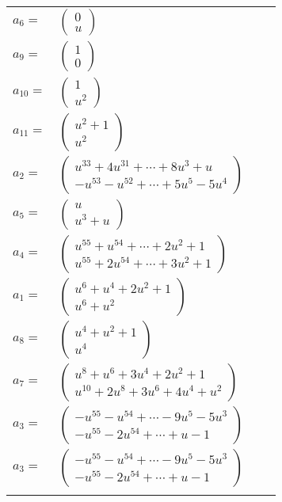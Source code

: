 \documentclass[1p]{elsarticle_modified}
\theoremstyle{definition}
\begin{document}
\begin{tabular}{m{7pt} m{180pt} m{7pt} m{180pt} }
\flushright $a_{6}=$&$\begin{pmatrix}0\\u\end{pmatrix}$ \\
\flushright $a_{9}=$&$\begin{pmatrix}1\\0\end{pmatrix}$ \\
\flushright $a_{10}=$&$\begin{pmatrix}1\\u^2\end{pmatrix}$ \\
\flushright $a_{11}=$&$\begin{pmatrix}u^2+1\\u^2\end{pmatrix}$ \\
\flushright $a_{2}=$&$\begin{pmatrix}u^{33}+4 u^{31}+\cdots+8 u^3+u\\- u^{53}- u^{52}+\cdots+5 u^5-5 u^4\end{pmatrix}$ \\
\flushright $a_{5}=$&$\begin{pmatrix}u\\u^3+u\end{pmatrix}$ \\
\flushright $a_{4}=$&$\begin{pmatrix}u^{55}+u^{54}+\cdots+2 u^2+1\\u^{55}+2 u^{54}+\cdots+3 u^2+1\end{pmatrix}$ \\
\flushright $a_{1}=$&$\begin{pmatrix}u^6+u^4+2 u^2+1\\u^6+u^2\end{pmatrix}$ \\
\flushright $a_{8}=$&$\begin{pmatrix}u^4+u^2+1\\u^4\end{pmatrix}$ \\
\flushright $a_{7}=$&$\begin{pmatrix}u^8+u^6+3 u^4+2 u^2+1\\u^{10}+2 u^8+3 u^6+4 u^4+u^2\end{pmatrix}$ \\
\flushright $a_{3}=$&$\begin{pmatrix}- u^{55}- u^{54}+\cdots-9 u^5-5 u^3\\- u^{55}-2 u^{54}+\cdots+u-1\end{pmatrix}$\\ \flushright $a_{3}=$&$\begin{pmatrix}- u^{55}- u^{54}+\cdots-9 u^5-5 u^3\\- u^{55}-2 u^{54}+\cdots+u-1\end{pmatrix}$\\&\end{tabular}
\end{document}
